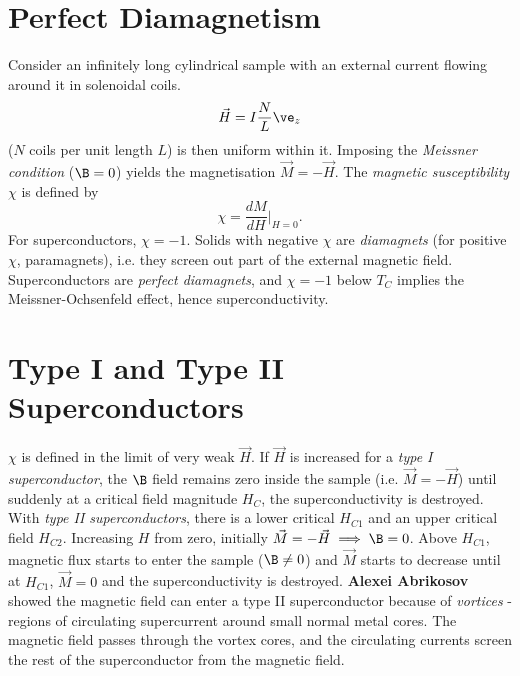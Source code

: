 \documentclass[qo.tex]{subfiles}
\begin{document}
\section{Perfect Diamagnetism}
Consider an infinitely long cylindrical sample with an external current flowing around it in solenoidal coils. 
\begin{equation}
    \vec{H}=I\frac{N}{L}\ve_z
\end{equation}
($N$ coils per unit length $L$) is then uniform within it. 
Imposing the \emph{Meissner condition} ($\B=0$) yields the magnetisation $\vec{M}=-\vec{H}$.
The \emph{magnetic susceptibility} $\chi$ is defined by
\begin{equation}
    \chi = \frac{dM}{dH}\bigg|_{H=0}.
\end{equation}
For superconductors, $\chi=-1$.
Solids with negative $\chi$ are \emph{diamagnets} (for positive $\chi$, paramagnets), i.e. they screen out part of the external magnetic field. 
Superconductors are \emph{perfect diamagnets}, and $\chi=-1$ below $T_C$ implies the Meissner-Ochsenfeld effect, hence superconductivity. 

\section{Type I and Type II Superconductors}
$\chi$ is defined in the limit of very weak $\vec{H}$.
If $\vec{H}$ is increased for a \emph{type I superconductor}, the $\B$ field remains zero inside the sample (i.e. $\vec{M}=-\vec{H}$) until suddenly at a critical field magnitude $H_C$, the superconductivity is destroyed. 
With \emph{type II superconductors}, there is a lower critical $H_{C1}$ and an upper critical field $H_{C2}$. 
Increasing $H$ from zero, initially $\vec{M}=-\vec{H}\implies\B=0$.
Above $H_{C1}$, magnetic flux starts to enter the sample ($\B\neq0$) and $\vec{M}$ starts to decrease until at $H_{C1}$, $\vec{M}=0$ and the superconductivity is destroyed. 
\textbf{Alexei Abrikosov} showed the magnetic field can enter a type II superconductor because of \emph{vortices} - regions of circulating supercurrent around small normal metal cores. 
The magnetic field passes through the vortex cores, and the circulating currents screen the rest of the superconductor from the magnetic field. 
\end{document}
